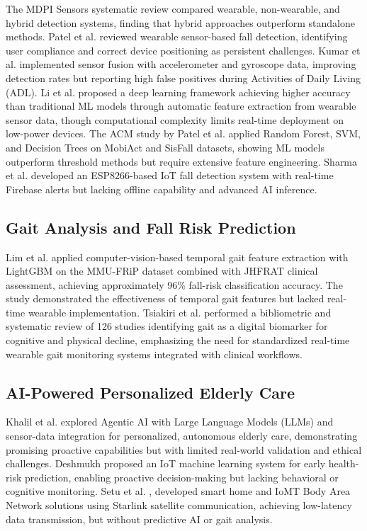 \documentclass[conference]{IEEEtran}
\begin{document}
The MDPI Sensors systematic review \cite{b15} compared wearable, non-wearable, and hybrid detection systems, finding that hybrid approaches outperform standalone methods. Patel et al. \cite{b16} reviewed wearable sensor-based fall detection, identifying user compliance and correct device positioning as persistent challenges. Kumar et al. \cite{b4} implemented sensor fusion with accelerometer and gyroscope data, improving detection rates but reporting high false positives during Activities of Daily Living (ADL). Li et al. \cite{b33} proposed a deep learning framework achieving higher accuracy than traditional ML models through automatic feature extraction from wearable sensor data, though computational complexity limits real-time deployment on low-power devices. The ACM study by Patel et al. \cite{b34} applied Random Forest, SVM, and Decision Trees on MobiAct and SisFall datasets, showing ML models outperform threshold methods but require extensive feature engineering. Sharma et al. \cite{b35} developed an ESP8266-based IoT fall detection system with real-time Firebase alerts but lacking offline capability and advanced AI inference.

\subsection{Gait Analysis and Fall Risk Prediction}

Lim et al. \cite{b17} applied computer-vision-based temporal gait feature extraction with LightGBM on the MMU-FRiP dataset combined with JHFRAT clinical assessment, achieving approximately 96\% fall-risk classification accuracy. The study demonstrated the effectiveness of temporal gait features but lacked real-time wearable implementation. Tsiakiri et al. \cite{b18} performed a bibliometric and systematic review of 126 studies identifying gait as a digital biomarker for cognitive and physical decline, emphasizing the need for standardized real-time wearable gait monitoring systems integrated with clinical workflows.

\subsection{AI-Powered Personalized Elderly Care}

Khalil et al. \cite{b22} explored Agentic AI with Large Language Models (LLMs) and sensor-data integration for personalized, autonomous elderly care, demonstrating promising proactive capabilities but with limited real-world validation and ethical challenges. Deshmukh \cite{b21} proposed an IoT machine learning system for early health-risk prediction, enabling proactive decision-making but lacking behavioral or cognitive monitoring. Setu et al. \cite{b19}, \cite{b20} developed smart home and IoMT Body Area Network solutions using Starlink satellite communication, achieving low-latency data transmission, but without predictive AI or gait analysis.
\end{document}
